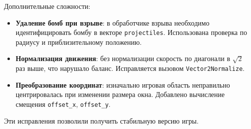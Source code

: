 \documentclass[../main.tex]{subfiles}
\begin{document}
Дополнительные сложности:
\begin{itemize}
	\item \textbf{Удаление бомб при взрыве}: в обработчике взрыва необходимо идентифицировать бомбу в векторе \texttt{projectiles}. Использована проверка по радиусу и приблизительному положению.
	\item \textbf{Нормализация движения}: без нормализации скорость по диагонали в $\sqrt{2}$ раз выше, что нарушало баланс. Исправляется вызовом \texttt{Vector2Normalize}.
	\item \textbf{Преобразование координат}: изначально игровая область неправильно центрировалась при изменении размера окна. Добавлено вычисление смещения \texttt{offset\_x}, \texttt{offset\_y}.
\end{itemize}

Эти исправления позволили получить стабильную версию игры.
\end{document}

